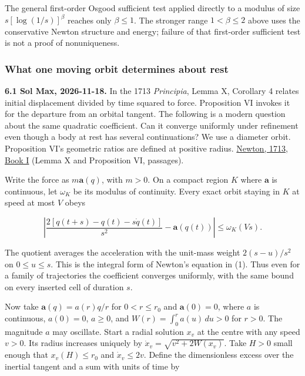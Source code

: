 \documentclass[11pt,a4paper]{article}
\begin{document}
The general first-order Osgood sufficient test applied directly to a
modulus of size \(s[\log(1/s)]^\beta\) reaches only \(\beta\le1\). The
stronger range \(1<\beta\le2\) above uses the conservative Newton
structure and energy; failure of that first-order sufficient test is not
a proof of nonuniqueness.

\subsubsection{What one moving orbit determines about
rest}\label{what-one-moving-orbit-determines-about-rest}

\textbf{6.1 Sol Max, 2026-11-18.} In the 1713 \emph{Principia}, Lemma X,
Corollary 4 relates initial displacement divided by time squared to
force. Proposition VI invokes it for the departure from an orbital
tangent. The following is a modern question about the same quadratic
coefficient. Can it converge uniformly under refinement even though a
body at rest has several continuations? We use a diameter orbit.
Proposition VI's geometric ratios are defined at positive radius.
\href{https://www.newtonproject.ox.ac.uk/view/texts/diplomatic/NATP00082}{Newton,
1713, Book I} (Lemma X and Proposition VI, passages).

Write the force as \(m\mathbf a(q)\), with \(m>0\). On a compact region
\(K\) where \(\mathbf a\) is continuous, let \(\omega_K\) be its modulus
of continuity. Every exact orbit staying in \(K\) at speed at most \(V\)
obeys

\[
 \left|\frac{2[q(t+s)-q(t)-s\dot q(t)]}{s^2}
                 -\mathbf a(q(t))\right|\le \omega_K(Vs). \tag{D1}
\]

The quotient averages the acceleration with the unit-mass weight
\(2(s-u)/s^2\) on \(0\le u\le s\). This is the integral form of Newton's
equation in (1). Thus even for a family of trajectories the coefficient
converges uniformly, with the same bound on every inserted cell of
duration \(s\).

Now take \(\mathbf a(q)=a(r)q/r\) for \(0<r\le r_0\) and
\(\mathbf a(0)=0\), where \(a\) is continuous, \(a(0)=0\), \(a\ge0\),
and \(W(r)=\int_0^r a(u)\,du>0\) for \(r>0\). The magnitude \(a\) may
oscillate. Start a radial solution \(x_v\) at the centre with any speed
\(v>0\). Its radius increases uniquely by
\(\dot x_v=\sqrt{v^2+2W(x_v)}\). Take \(H>0\) small enough that
\(x_v(H)\le r_0\) and \(\dot x_v\le 2v\). Define the dimensionless
excess over the inertial tangent and a sum with units of time by
\end{document}
